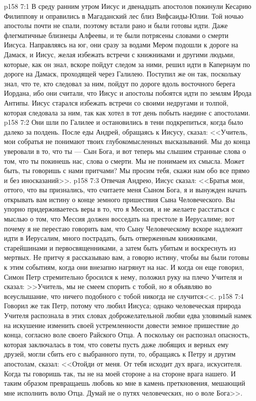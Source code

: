 \vs p158 7:1 В среду ранним утром Иисус и двенадцать апостолов покинули Кесарию Филиппову и оправились в Магаданский лес близ Вифсаиды\hyp{}Юлии. Той ночью апостолы почти не спали, поэтому встали рано и были готовы идти. Даже флегматичные близнецы Алфеевы, и те были потрясены словами о смерти Иисуса. Направляясь на юг, они сразу за водами Мером подошли к дороге на Дамаск, и Иисус, желая избежать встречи с книжниками и другими людьми, которые, как он знал, вскоре пойдут следом за ними, решил идти в Капернаум по дороге на Дамаск, проходящей через Галилею. Поступил же он так, поскольку знал, что те, кто следовал за ним, пойдут по дороге вдоль восточного берега Иордана, ибо они считали, что Иисус и апостолы побоятся идти по землям Ирода Антипы. Иисус старался избежать встречи со своими недругами и толпой, которая следовала за ним, так как хотел в тот день побыть наедине с апостолами.
\vs p158 7:2 Они шли по Галилее и остановились в тени подкрепиться, когда было далеко за полдень. После еды Андрей, обращаясь к Иисусу, сказал: <<Учитель, мои собратья не понимают твоих глубокомысленных высказываний. Мы до конца уверовали в то, что ты --- Сын Бога, и вот теперь мы слышим странные слова о том, что ты покинешь нас, слова о смерти. Мы не понимаем их смысла. Может быть, ты говоришь с нами притчами? Мы просим тебя, скажи нам обо все прямо и без иносказаний>>.
\vs p158 7:3 Отвечая Андрею, Иисус сказал: <<Братья мои, оттого, что вы признались, что считаете меня Сыном Бога, я и вынужден начать открывать вам истину о конце земного пришествия Сына Человеческого. Вы упорно придерживаетесь веры в то, что я Мессия, и не желаете расстаться с мыслью о том, что Мессия должен восседать на престоле в Иерусалиме; вот почему я не перестаю говорить вам, что Сыну Человеческому вскоре надлежит идти в Иерусалим, много пострадать, быть отверженным книжниками, старейшинами и первосвященниками, а затем быть убитым и воскреснуть из мертвых. Не притчу я рассказываю вам, а говорю истину, чтобы вы были готовы к этим событиям, когда они внезапно нагрянут на нас. И когда он еще говорил, Симон Петр стремительно бросился к нему, положил руку на плечо Учителя и сказал: >>Учитель, мы не смеем спорить с тобой, но я объявляю во всеуслышание, что ничего подобного с тобой никогда не случится<<.
\vs p158 7:4 Говорил же так Петр, потому что любил Иисуса; однако человеческая природа Учителя распознала в этих словах доброжелательной любви едва уловимый намек на искушение изменить своей устремленности довести земное пришествие до конца, согласно воле своего Райского Отца. А поскольку он распознал опасность, которая заключалась в том, что советы пусть даже любящих и верных ему друзей, могли сбить его с выбранного пути, то, обращаясь к Петру и другим апостолам, сказал: <<Отойди от меня. От тебя исходит дух врага, искусителя. Когда ты говоришь так, ты не на моей стороне а на стороне врага нашего. И таким образом превращаешь любовь ко мне в камень преткновения, мешающий мне исполнить волю Отца. Думай не о путях человеческих, но о воле Бога>>.
